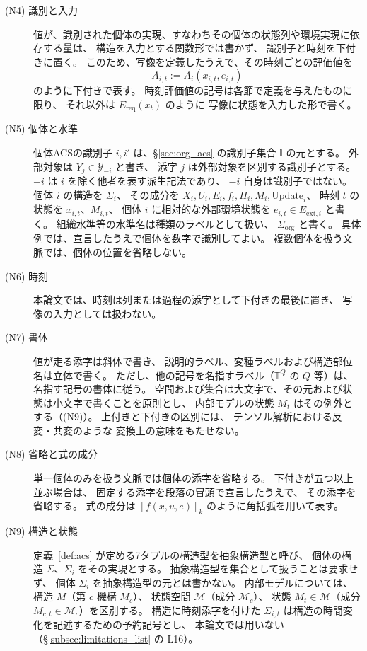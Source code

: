 \begin{description}
  \item[(N4) 識別と入力]
    値が、識別された個体の実現、すなわちその個体の状態列や環境実現に依存する量は、
    構造を入力とする関数形では書かず、
    識別子と時刻を下付きに置く。
    このため、写像を定義したうえで、その時刻ごとの評価値を
    \[
      A_{i,t}:=A_i(x_{i,t},e_{i,t})
    \]
    のように下付きで表す。
    時刻評価値の記号は各節で定義を与えたものに限り、
    それ以外は $E_{\mathrm{req}}(x_t)$ のように
    写像に状態を入力した形で書く。

  \item[(N5) 個体と水準]
    個体ACSの識別子 $i,i'$ は、\S\ref{sec:org_acs} の識別子集合 $\mathbb I$ の元とする。
    外部対象は $Y_j\in\mathcal Y_{-i}$ と書き、
    添字 $j$ は外部対象を区別する識別子とする。
    $-i$ は $i$ を除く他者を表す派生記法であり、
    $-i$ 自身は識別子ではない。
    個体 $i$ の構造を $\Sigma_i$、
    その成分を $X_i,U_i,E_i,f_i,\Pi_i,M_i,\mathrm{Update}_i$、
    時刻 $t$ の状態を $x_{i,t}$、$M_{i,t}$、
    個体 $i$ に相対的な外部環境状態を
    $e_{i,t}\in E_{\mathrm{ext},i}$ と書く。
    組織水準等の水準名は種類のラベルとして扱い、
    $\Sigma_{\mathrm{org}}$ と書く。
    具体例では、宣言したうえで個体を数字で識別してよい。
    複数個体を扱う文脈では、個体の位置を省略しない。

  \item[(N6) 時刻]
    本論文では、時刻は列または過程の添字として下付きの最後に置き、
    写像の入力としては扱わない。

  \item[(N7) 書体]
    値が走る添字は斜体で書き、
    説明的ラベル、変種ラベルおよび構造部位名は立体で書く。
    ただし、他の記号を名指すラベル（$\mathbb T^{Q}$ の $Q$ 等）は、
    名指す記号の書体に従う。
    空間および集合は大文字で、その元および状態は小文字で書くことを原則とし、
    内部モデルの状態 $M_t$ はその例外とする（(N9)）。
    上付きと下付きの区別には、
    テンソル解析における反変・共変のような
    変換上の意味をもたせない。

  \item[(N8) 省略と式の成分]
    単一個体のみを扱う文脈では個体の添字を省略する。
    下付きが五つ以上並ぶ場合は、
    固定する添字を段落の冒頭で宣言したうえで、
    その添字を省略する。
    式の成分は $[f(x,u,e)]_k$ のように角括弧を用いて表す。

  \item[(N9) 構造と状態]
    定義~\ref{def:acs} が定める7タプルの構造型を抽象構造型と呼び、
    個体の構造 $\Sigma$、$\Sigma_i$ をその実現とする。
    抽象構造型を集合として扱うことは要求せず、
    個体 $\Sigma_i$ を抽象構造型の元とは書かない。
    内部モデルについては、
    構造 $M$（第 $c$ 機構 $M_c$）、
    状態空間 $\mathcal M$（成分 $\mathcal M_c$）、
    状態 $M_t\in\mathcal M$（成分 $M_{c,t}\in\mathcal M_c$）を区別する。
    構造に時刻添字を付けた $\Sigma_{i,t}$ は構造の時間変化を記述するための予約記号とし、
    本論文では用いない（\S\ref{subsec:limitations_list} の L16）。


\end{description}
